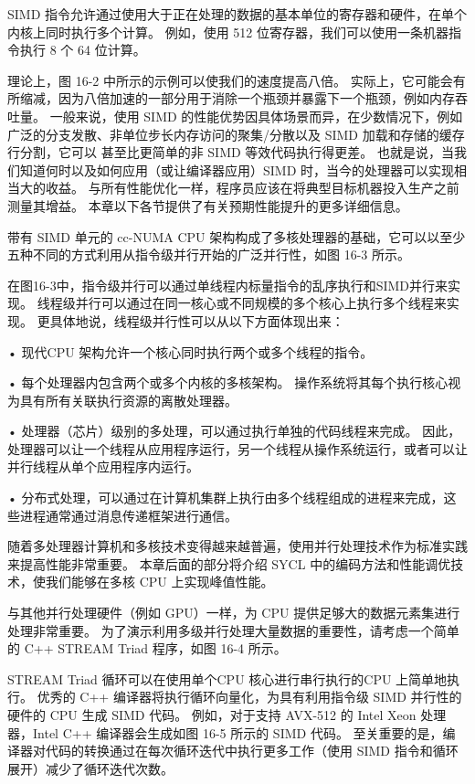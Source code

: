 SIMD 指令允许通过使用大于正在处理的数据的基本单位的寄存器和硬件，在单个内核上同时执行多个计算。 例如，使用 512 位寄存器，我们可以使用一条机器指令执行 8 个 64 位计算。

理论上，图 16-2 中所示的示例可以使我们的速度提高八倍。 实际上，它可能会有所缩减，因为八倍加速的一部分用于消除一个瓶颈并暴露下一个瓶颈，例如内存吞吐量。 一般来说，使用 SIMD 的性能优势因具体场景而异，在少数情况下，例如广泛的分支发散、非单位步长内存访问的聚集/分散以及 SIMD 加载和存储的缓存行分割，它可以 甚至比更简单的非 SIMD 等效代码执行得更差。 也就是说，当我们知道何时以及如何应用（或让编译器应用）SIMD 时，当今的处理器可以实现相当大的收益。 与所有性能优化一样，程序员应该在将典型目标机器投入生产之前测量其增益。 本章以下各节提供了有关预期性能提升的更多详细信息。

带有 SIMD 单元的 cc-NUMA CPU 架构构成了多核处理器的基础，它可以以至少五种不同的方式利用从指令级并行开始的广泛并行性，如图 16-3 所示。

在图16-3中，指令级并行可以通过单线程内标量指令的乱序执行和SIMD并行来实现。 线程级并行可以通过在同一核心或不同规模的多个核心上执行多个线程来实现。 更具体地说，线程级并行性可以从以下方面体现出来：

• 现代CPU 架构允许一个核心同时执行两个或多个线程的指令。

• 每个处理器内包含两个或多个内核的多核架构。 操作系统将其每个执行核心视为具有所有关联执行资源的离散处理器。

• 处理器（芯片）级别的多处理，可以通过执行单独的代码线程来完成。 因此，处理器可以让一个线程从应用程序运行，另一个线程从操作系统运行，或者可以让并行线程从单个应用程序内运行。

• 分布式处理，可以通过在计算机集群上执行由多个线程组成的进程来完成，这些进程通常通过消息传递框架进行通信。

随着多处理器计算机和多核技术变得越来越普遍，使用并行处理技术作为标准实践来提高性能非常重要。 本章后面的部分将介绍 SYCL 中的编码方法和性能调优技术，使我们能够在多核 CPU 上实现峰值性能。

与其他并行处理硬件（例如 GPU）一样，为 CPU 提供足够大的数据元素集进行处理非常重要。 为了演示利用多级并行处理大量数据的重要性，请考虑一个简单的 C++ STREAM Triad 程序，如图 16-4 所示。

STREAM Triad 循环可以在使用单个CPU 核心进行串行执行的CPU 上简单地执行。 优秀的 C++ 编译器将执行循环向量化，为具有利用指令级 SIMD 并行性的硬件的 CPU 生成 SIMD 代码。 例如，对于支持 AVX-512 的 Intel Xeon 处理器，Intel C++ 编译器会生成如图 16-5 所示的 SIMD 代码。 至关重要的是，编译器对代码的转换通过在每次循环迭代中执行更多工作（使用 SIMD 指令和循环展开）减少了循环迭代次数。

